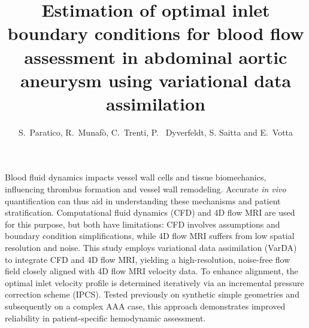 \graphicspath{{chapters/chp1/graphics/}}

\title{Estimation of optimal inlet boundary conditions for blood flow assessment in abdominal aortic aneurysm using variational data assimilation}

\author{S.~Paratico, R.~Munaf\`o, C.~Trenti, P.~ Dyverfeldt, S. Saitta and E.~Votta}

\maketitle

\abstract{}
Blood fluid dynamics impacts vessel wall cells and tissue biomechanics, influencing thrombus formation and vessel wall remodeling. Accurate \textit{in vivo} quantification can thus aid in understanding these mechanisms and patient stratification. Computational fluid dynamics (CFD) and 4D flow MRI are used for this purpose, but both have limitations: CFD involves assumptions and boundary condition simplifications, while 4D flow MRI suffers from low spatial resolution and noise. This study employs variational data assimilation (VarDA) to integrate CFD and 4D flow MRI, yielding a high-resolution, noise-free flow field closely aligned with 4D flow MRI velocity data. To enhance alignment, the optimal inlet velocity profile is determined iteratively via an incremental pressure correction scheme (IPCS). Tested previously on synthetic simple geometries and subsequently on a complex AAA case, this approach demonstrates improved reliability in patient-specific hemodynamic assessment.

